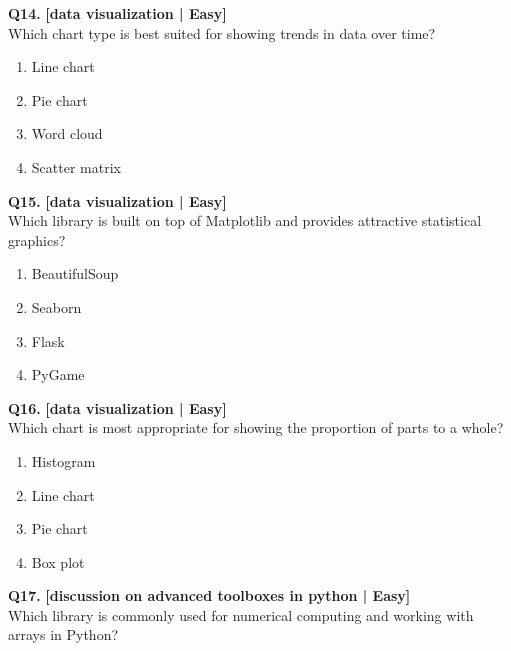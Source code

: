 \noindent\textbf{Q14.} \hfill {\small\color{LPUOrange}\textbf{[data visualization | Easy]}}\\[2pt]
Which chart type is best suited for showing trends in data over time?

\begin{enumerate}[label=(\alph*),topsep=2pt,itemsep=1pt,partopsep=0pt,parsep=0pt]
    \item \relax Line chart
    \item \relax Pie chart
    \item \relax Word cloud
    \item \relax Scatter matrix
\end{enumerate}
\vspace{2mm}

\noindent\textbf{Q15.} \hfill {\small\color{LPUOrange}\textbf{[data visualization | Easy]}}\\[2pt]
Which library is built on top of Matplotlib and provides attractive statistical graphics?

\begin{enumerate}[label=(\alph*),topsep=2pt,itemsep=1pt,partopsep=0pt,parsep=0pt]
    \item \relax BeautifulSoup
    \item \relax Seaborn
    \item \relax Flask
    \item \relax PyGame
\end{enumerate}
\vspace{2mm}

\noindent\textbf{Q16.} \hfill {\small\color{LPUOrange}\textbf{[data visualization | Easy]}}\\[2pt]
Which chart is most appropriate for showing the proportion of parts to a whole?

\begin{enumerate}[label=(\alph*),topsep=2pt,itemsep=1pt,partopsep=0pt,parsep=0pt]
    \item \relax Histogram
    \item \relax Line chart
    \item \relax Pie chart
    \item \relax Box plot
\end{enumerate}
\vspace{2mm}

\noindent\textbf{Q17.} \hfill {\small\color{LPUOrange}\textbf{[discussion on advanced toolboxes in python | Easy]}}\\[2pt]
Which library is commonly used for numerical computing and working with arrays in Python?

